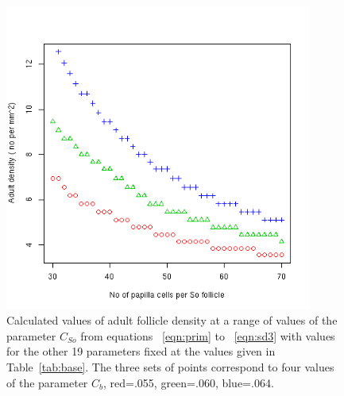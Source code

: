 %

\begin{figure}[!h]
  \centering
   \includegraphics[width=0.9\textwidth]{soavecellnodens.png}
  \caption{Calculated values of adult follicle density at a range of values of the parameter $C_{So}$  from equations ~\ref{eqn:prim} to ~\ref{eqn:sd3} with values for the other 19  parameters fixed at the values given in Table~\ref{tab:base}. The three sets of points correspond to four values of the parameter $C_{b}$, red=.055, green=.060, blue=.064.}
  \label{fig:soavecellnodens}
\end{figure}

%

